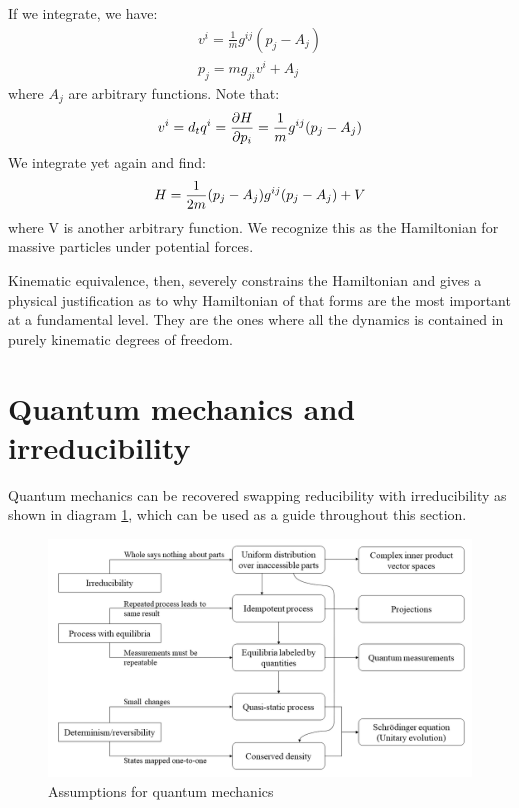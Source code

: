 \documentclass[11pt,letterpaper,fleqn]{memoir} %
\begin{document}
If we integrate, we have:
\begin{equation}
\begin{aligned}
v^i = \frac{1}{m} g^{ij}(p_j - A_j) \\
p_j = m g_{ji} v^i + A_j
\end{aligned}
\end{equation}
where $A_j$ are arbitrary functions. Note that:
\begin{equation}
v^i = d_t q^i = \frac{\partial H }{\partial p_i} = \frac{1}{m} g^{ij}(p_j - A_j) \\
\end{equation}
We integrate yet again and find:
\begin{equation}
H = \frac{1}{2m} (p_j - A_j) g^{ij}(p_j - A_j) + V \\
\end{equation}
where V is another arbitrary function. We recognize this as the Hamiltonian for massive particles under potential forces.

Kinematic equivalence, then, severely constrains the Hamiltonian and gives a physical justification as to why Hamiltonian of that forms are the most important at a fundamental level. They are the ones where all the dynamics is contained in purely kinematic degrees of freedom.

\section{Quantum mechanics and irreducibility}

Quantum mechanics can be recovered swapping reducibility with irreducibility as shown in diagram \ref{fig_quantum_diagram}, which can be used as a guide throughout this section.

\begin{figure}[h]
	\includegraphics[width=\columnwidth]{images/QuantumDiagram.png}
	\caption{Assumptions for quantum mechanics}\label{fig_quantum_diagram}
\end{figure}
\end{document}

